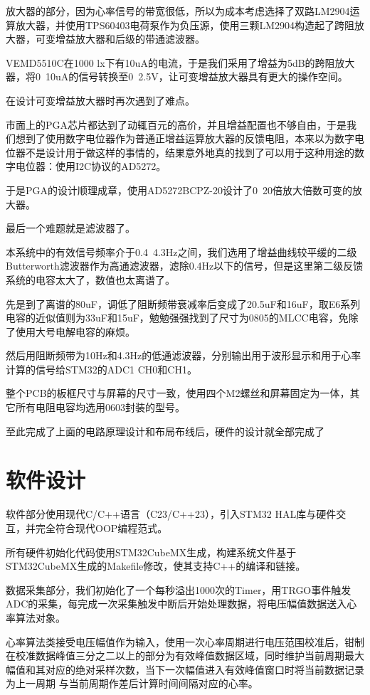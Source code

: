 \documentclass[a4paper]{ctexart}
\begin{document}
	放大器的部分，因为心率信号的带宽很低，所以为成本考虑选择了双路LM2904运算放大器，并使用TPS60403电荷泵作为负压源，使用三颗LM2904构造起了跨阻放大器，可变增益放大器和后级的带通滤波器。
	
	VEMD5510C在1000 lx下有10uA的电流，于是我们采用了增益为5dB的跨阻放大器，将0~10uA的信号转换至0~2.5V，让可变增益放大器具有更大的操作空间。
	
	在设计可变增益放大器时再次遇到了难点。
	
	市面上的PGA芯片都达到了动辄百元的高价，并且增益配置也不够自由，于是我们想到了使用数字电位器作为普通正增益运算放大器的反馈电阻，本来以为数字电位器不是设计用于做这样的事情的，结果意外地真的找到了可以用于这种用途的数字电位器：使用I2C协议的AD5272。
	
	于是PGA的设计顺理成章，使用AD5272BCPZ-20设计了0~20倍放大倍数可变的放大器。
	
	最后一个难题就是滤波器了。
	
	本系统中的有效信号频率介于0.4~4.3Hz之间，我们选用了增益曲线较平缓的二级Butterworth滤波器作为高通滤波器，滤除0.4Hz以下的信号，但是这里第二级反馈系统的电容太大了，数值也太离谱了。
	
	先是到了离谱的80uF，调低了阻断频带衰减率后变成了20.5uF和16uF，取E6系列电容的近似值则为33uF和15uF，勉勉强强找到了尺寸为0805的MLCC电容，免除了使用大号电解电容的麻烦。
	
	然后用阻断频带为10Hz和4.3Hz的低通滤波器，分别输出用于波形显示和用于心率计算的信号给STM32的ADC1 CH0和CH1。

	整个PCB的板框尺寸与屏幕的尺寸一致，使用四个M2螺丝和屏幕固定为一体，其它所有电阻电容均选用0603封装的型号。
	
	至此完成了上面的电路原理设计和布局布线后，硬件的设计就全部完成了

\newpage
\section{软件设计}

	软件部分使用现代C/C++语言（C23/C++23），引入STM32 HAL库与硬件交互，并完全符合现代OOP编程范式。
	
	所有硬件初始化代码使用STM32CubeMX生成，构建系统文件基于STM32CubeMX生成的Makefile修改，使其支持C++的编译和链接。
	
	数据采集部分，我们初始化了一个每秒溢出1000次的Timer，用TRGO事件触发ADC的采集，每完成一次采集触发中断后开始处理数据，将电压幅值数据送入心率算法对象。
	
	心率算法类接受电压幅值作为输入，使用一次心率周期进行电压范围校准后，钳制在校准数据峰值三分之二以上的部分为有效峰值数据区域，同时维护当前周期最大幅值和其对应的绝对采样次数，当下一次幅值进入有效峰值窗口时将当前数据记录为上一周期 与当前周期作差后计算时间间隔对应的心率。
	
\end{document}
